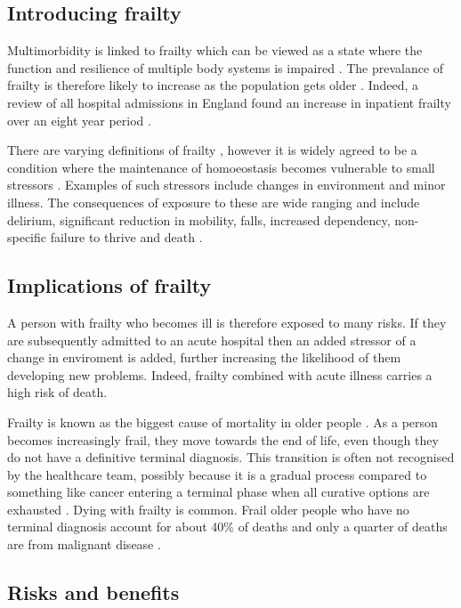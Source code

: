 \documentclass
[
	12pt,
	a4paper,
	oneside,
]{report}
\begin{document}
\subsection{Introducing frailty}

Multimorbidity is linked to frailty which can be viewed as a state where 
the function and resilience of multiple body systems is impaired \parencite{woo:14}. 
The prevalance of frailty is therefore likely to increase as the population
gets older \parencite{sharp:13}. Indeed, a review of all hospital admissions in 
England found an increase in inpatient frailty over an eight year period 
\parencite{soong:15}.

There are varying definitions of frailty \parencite{soong:15}, however it is 
widely agreed to be a condition where the maintenance of homoeostasis 
becomes vulnerable to  small stressors \parencite{vellas:16}. Examples of such 
stressors include changes in environment and minor illness. The consequences of 
exposure to these are wide ranging and include delirium, significant reduction 
in mobility, falls, increased dependency, non-specific failure to thrive and death 
\parencite{bgs:14,oliver:14,vellas:16}.

\subsection{Implications of frailty}

A person with frailty who becomes ill is therefore exposed to many risks. If
they are subsequently admitted to an acute hospital then an added stressor of a 
change in enviroment is added, further increasing the likelihood of them developing
new problems. Indeed, frailty combined with acute illness carries a high risk 
of death.

Frailty is known as the biggest cause of mortality in older people 
\parencite{gill:10}. As a person becomes increasingly frail, they move towards 
the end of life, even 
though they do not have a definitive terminal diagnosis. This transition is
often not recognised by the healthcare team, possibly because it is a gradual process
compared to something like cancer entering a terminal phase when all curative
options are exhausted \parencite{oliver:14}. Dying with frailty is common.
Frail older people who have no terminal diagnosis account for about 40\% of 
deaths and only a quarter of deaths are from malignant disease \parencite{sharp:13}.

\subsection{Risks and benefits}
\label{sec:risk-ben}
\end{document}

